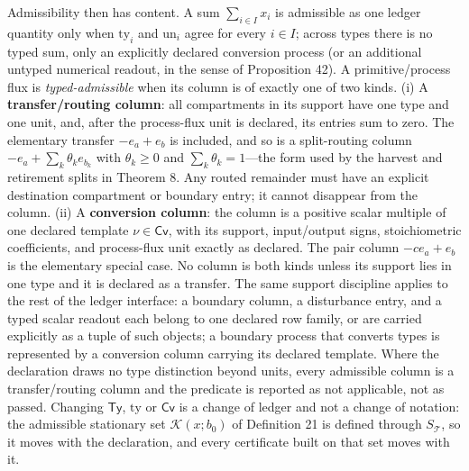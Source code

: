 \documentclass[11pt]{article}
\begin{document}
Admissibility then has content. A sum \(\sum_{i \in I} x_i\) is admissible as one ledger quantity only when \(\mathrm{ty}_i\) and \(\mathrm{un}_i\) agree for every \(i \in I\); across types there is no typed sum, only an explicitly declared conversion process (or an additional untyped numerical readout, in the sense of Proposition 42). A primitive/process flux is \emph{typed-admissible} when its column is of exactly one of two kinds.
(i) A \textbf{transfer/routing column}: all compartments in its support have one type and one unit, and, after the process-flux unit is declared, its entries sum to zero. The elementary transfer \(-e_a+e_b\) is included, and so is a split-routing column \(-e_a+\sum_k\theta_k e_{b_k}\) with \(\theta_k\ge0\) and \(\sum_k\theta_k=1\)---the form used by the harvest and retirement splits in Theorem 8. Any routed remainder must have an explicit destination compartment or boundary entry; it cannot disappear from the column.
(ii) A \textbf{conversion column}: the column is a positive scalar multiple of one declared template \(\nu\in\mathsf{Cv}\), with its support, input/output signs, stoichiometric coefficients, and process-flux unit exactly as declared. The pair column \(-c e_a+e_b\) is the elementary special case.
No column is both kinds unless its support lies in one type and it is declared as a transfer. The same support discipline applies to the rest of the ledger interface: a boundary column, a disturbance entry, and a typed scalar readout each belong to one declared row family, or are carried explicitly as a tuple of such objects; a boundary process that converts types is represented by a conversion column carrying its declared template. Where the declaration draws no type distinction beyond units, every admissible column is a transfer/routing column and the predicate is reported as not applicable, not as passed. Changing \(\mathsf{Ty}\), \(\mathrm{ty}\) or \(\mathsf{Cv}\) is a change of ledger and not a change of notation: the admissible stationary set \(\mathcal K(x;b_0)\) of Definition 21 is defined through \(S_{\mathcal{T}}\), so it moves with the declaration, and every certificate built on that set moves with it.
\end{document}
